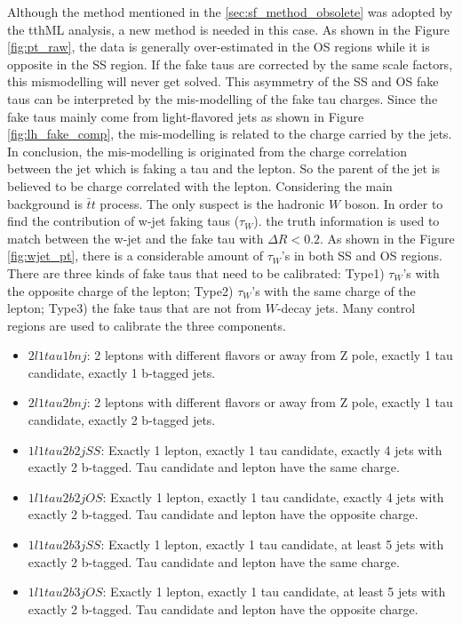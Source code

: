 Although the method mentioned in the \ref{sec:sf_method_obsolete} was adopted by the tthML analysis, a new method is needed in this case. As shown in the Figure \ref{fig:pt_raw}, the data is generally over-estimated in the OS regions while it is opposite in the SS region. If the fake taus are corrected by the same scale factors, this mismodelling will never get solved. This asymmetry of the SS and OS fake taus can be interpreted by the mis-modelling of the fake tau charges. Since the fake taus mainly come from light-flavored jets as shown in Figure \ref{fig:lh_fake_comp}, the mis-modelling is related to the charge carried by the jets. In conclusion, the mis-modelling is originated from the charge correlation between the jet which is faking a tau and the lepton. So the parent of the jet is believed to be charge correlated with the lepton. Considering the main background is $\bar{t}t$ process. The only suspect is the hadronic $W$ boson. In order to find the contribution of w-jet faking taus ($\tau_{W}$).  the truth information is used to match between the w-jet and the fake tau with $\Delta R < 0.2$. As shown in the Figure \ref{fig:wjet_pt}, there is a considerable amount of $\tau_{W}$'s in both SS and OS regions. There are three kinds of fake taus that need to be calibrated: Type1) $\tau_{W}$'s with the opposite charge of the lepton; Type2) $\tau_{W}$'s with the same charge of the lepton; Type3) the fake taus that are not from $W$-decay jets. Many control regions are used to calibrate the three components.


\begin{itemize}
\item{$2l1tau1bnj$: 2 leptons with different flavors or away from Z pole, exactly 1 tau candidate,  exactly 1 b-tagged jets.}
\item{$2l1tau2bnj$: 2 leptons with different flavors or away from Z pole, exactly 1 tau candidate,  exactly 2 b-tagged jets.}
\item{$1l1tau2b2j SS$: Exactly 1 lepton, exactly 1 tau candidate, exactly 4 jets with exactly 2 b-tagged. Tau candidate and lepton have the same charge.}
\item{$1l1tau2b2j OS$: Exactly 1 lepton, exactly 1 tau candidate, exactly 4 jets with exactly 2 b-tagged. Tau candidate and lepton have the opposite charge.}
\item{$1l1tau2b3j SS$: Exactly 1 lepton, exactly 1 tau candidate, at least 5 jets with exactly 2 b-tagged. Tau candidate and lepton have the same charge.}
\item{$1l1tau2b3j OS$: Exactly 1 lepton, exactly 1 tau candidate, at least 5 jets with exactly 2 b-tagged. Tau candidate and lepton have the opposite charge.}
\end{itemize}

